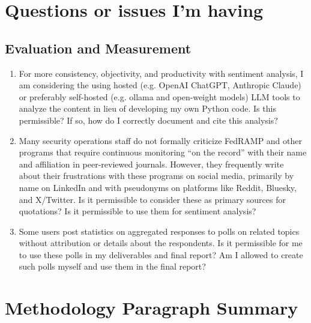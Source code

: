 \documentclass{jdf}
\begin{document}
\section*{Questions or issues I'm having}

\subsection*{Evaluation and Measurement}

\begin{enumerate}
    \item For more consistency, objectivity, and productivity with sentiment analysis, I am considering the using hosted (e.g. OpenAI ChatGPT, Anthropic Claude) or preferably self-hosted (e.g. ollama and open-weight models) LLM tools to analyze the content in lieu of developing my own Python code. Is this permissible? If so, how do I correctly document and cite this analysis?
    \item Many security operations staff do not formally criticize FedRAMP and other programs that require continuous monitoring ``on the record'' with their name and affiliation in peer-reviewed journals. However, they frequently write about their frustrations with these programs on social media, primarily by name on LinkedIn and with pseudonyms on platforms like Reddit, Bluesky, and X/Twitter. Is it permissible to consider these as primary sources for quotations? Is it permissible to use them for sentiment analysis?
    \item Some users post statistics on aggregated responses to polls on related topics without attribution or details about the respondents. Is it permissible for me to use these polls in my deliverables and final report? Am I allowed to create such polls myself and use them in the final report?
\end{enumerate}

\section*{Methodology Paragraph Summary}
\end{document}
